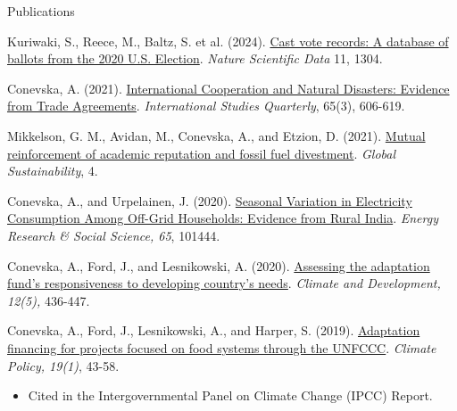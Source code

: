\documentclass{resume}
\begin{document}
\bigskip

\begin{rSection}{\Large  P\MakeLowercase{ublications}} \itemsep -3pt {}
\vspace{-0.7cm}

\item Kuriwaki, S., Reece, M., Baltz, S. et al. (2024). \href{https://doi.org/10.1038/s41597-024-04017-1}{Cast vote records: A database of ballots from the 2020 U.S. Election}. \textit{Nature Scientific Data} 11, 1304.
\medskip

\item Conevska, A. (2021). \href{https://doi.org/10.1093/isq/sqab065}{International Cooperation and Natural Disasters: Evidence from Trade Agreements}. \textit{International Studies Quarterly},  65(3), 606-619.
\medskip

\item Mikkelson, G. M., Avidan, M., Conevska, A., and Etzion, D. (2021). \href{https://doi.org/10.1017/sus.2021.19}{Mutual reinforcement of academic reputation and fossil fuel divestment}. \textit{Global Sustainability}, 4.
\medskip

\item Conevska, A., and Urpelainen, J. (2020). \href{https://doi.org/10.1016/j.erss.2020.101444}{Seasonal Variation in Electricity Consumption Among Off-Grid Households: Evidence from Rural India}. \textit{ Energy Research \& Social Science, 65}, 101444. 
\medskip

\item Conevska, A., Ford, J., and Lesnikowski, A. (2020). \href{https://doi.org/10.1080/17565529.2019.1638225}{Assessing the adaptation fund’s responsiveness to developing country’s needs}. \textit{Climate and Development, 12(5),} 436-447. 
\medskip

\item Conevska, A., Ford, J., Lesnikowski, A., and Harper, S. (2019). \href{https://doi.org/10.1080/14693062.2018.1466682}{Adaptation financing for projects focused on food systems through the UNFCCC}. \textit{Climate Policy, 19(1)}, 43-58. 
\begin{itemize}
    \item Cited in the Intergovernmental Panel on Climate Change (IPCC) Report.
\end{itemize}



\end{rSection}

\newpage
\end{document}
